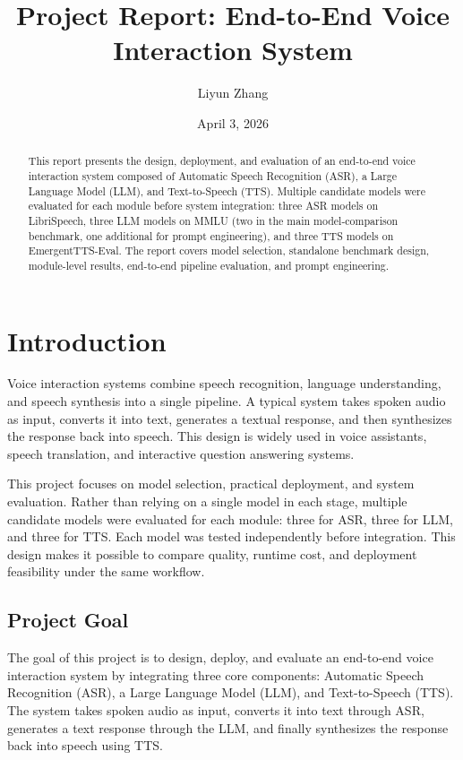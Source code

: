 \documentclass[12pt, a4paper]{article}
\title{\textbf{Project Report: End-to-End Voice Interaction System}}
\author{Liyun Zhang}
\date{April 3, 2026}
\begin{document}
\maketitle

\begin{abstract}
This report presents the design, deployment, and evaluation of an end-to-end voice interaction system composed of Automatic Speech Recognition (ASR), a Large Language Model (LLM), and Text-to-Speech (TTS). Multiple candidate models were evaluated for each module before system integration: three ASR models on LibriSpeech, three LLM models on MMLU (two in the main model-comparison benchmark, one additional for prompt engineering), and three TTS models on EmergentTTS-Eval. The report covers model selection, standalone benchmark design, module-level results, end-to-end pipeline evaluation, and prompt engineering.
\end{abstract}

\section{Introduction}

Voice interaction systems combine speech recognition, language understanding, and speech synthesis into a single pipeline. A typical system takes spoken audio as input, converts it into text, generates a textual response, and then synthesizes the response back into speech. This design is widely used in voice assistants, speech translation, and interactive question answering systems.

This project focuses on model selection, practical deployment, and system evaluation. Rather than relying on a single model in each stage, multiple candidate models were evaluated for each module: three for ASR, three for LLM, and three for TTS. Each model was tested independently before integration. This design makes it possible to compare quality, runtime cost, and deployment feasibility under the same workflow.

\subsection{Project Goal}

The goal of this project is to design, deploy, and evaluate an end-to-end voice interaction system by integrating three core components: Automatic Speech Recognition (ASR), a Large Language Model (LLM), and Text-to-Speech (TTS). The system takes spoken audio as input, converts it into text through ASR, generates a text response through the LLM, and finally synthesizes the response back into speech using TTS.
\end{document}
